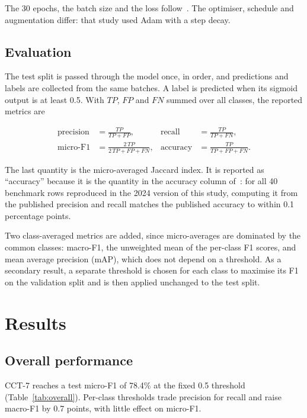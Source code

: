\documentclass[11pt]{article}
\begin{document}
The 30 epochs, the batch size and the loss follow~\cite{papoutsis}. The optimiser, schedule and
augmentation differ: that study used Adam with a step decay.

\subsection{Evaluation}

The test split is passed through the model once, in order, and predictions and labels are collected from
the same batches. A label is predicted when its sigmoid output is at least 0.5. With $TP$, $FP$ and $FN$
summed over all classes, the reported metrics are

\begin{align*}
\text{precision} &= \frac{TP}{TP+FP}, &
\text{recall} &= \frac{TP}{TP+FN}, \\[4pt]
\text{micro-F1} &= \frac{2\,TP}{2\,TP+FP+FN}, &
\text{accuracy} &= \frac{TP}{TP+FP+FN}.
\end{align*}

The last quantity is the micro-averaged Jaccard index. It is reported as ``accuracy'' because it is the
quantity in the accuracy column of~\cite{papoutsis}: for all 40 benchmark rows reproduced in the 2024
version of this study, computing it from the published precision and recall matches the published accuracy
to within 0.1 percentage points.

Two class-averaged metrics are added, since micro-averages are dominated by the common classes:
macro-F1, the unweighted mean of the per-class F1 scores, and mean average precision (mAP), which does
not depend on a threshold. As a secondary result, a separate threshold is chosen for each class to
maximise its F1 on the validation split and is then applied unchanged to the test split.

\section{Results}

\subsection{Overall performance}

CCT-7 reaches a test micro-F1 of 78.4\% at the fixed 0.5 threshold (Table~\ref{tab:overall}).
Per-class thresholds trade precision for recall and raise macro-F1 by 0.7 points, with little effect on
micro-F1.
\end{document}

